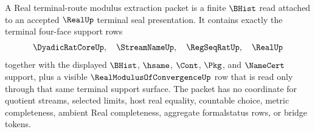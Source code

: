 \begin{definition}
\label{def:real-terminal-route-modulus-extraction}
A Real terminal-route modulus extraction packet is a finite $\BHist$ read
attached to an accepted $\RealUp$ terminal seal presentation. It contains
exactly the terminal four-face support rows
$$
\DyadicRatCoreUp,\quad \StreamNameUp,\quad \RegSeqRatUp,\quad \RealUp
$$
together with the displayed $\BHist$, $\hsame$, $\Cont$, $\Pkg$, and
$\NameCert$ support, plus a visible $\RealModulusOfConvergenceUp$ row that is
read only through that same terminal support surface. The packet has no
coordinate for quotient streams, selected limits, host real equality,
countable choice, metric completeness, ambient Real completeness, aggregate
formalstatus rows, or bridge tokens.
\end{definition}

